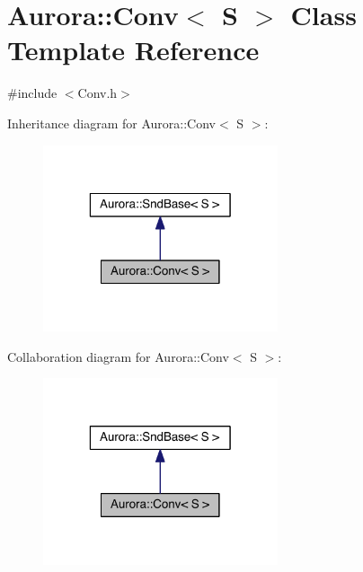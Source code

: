 \hypertarget{class_aurora_1_1_conv}{}\section{Aurora\+:\+:Conv$<$ S $>$ Class Template Reference}
\label{class_aurora_1_1_conv}


{\ttfamily \#include $<$Conv.\+h$>$}



Inheritance diagram for Aurora\+:\+:Conv$<$ S $>$\+:\nopagebreak
\begin{figure}[H]
\begin{center}
\leavevmode
\includegraphics[width=196pt]{class_aurora_1_1_conv__inherit__graph}
\end{center}
\end{figure}


Collaboration diagram for Aurora\+:\+:Conv$<$ S $>$\+:\nopagebreak
\begin{figure}[H]
\begin{center}
\leavevmode
\includegraphics[width=196pt]{class_aurora_1_1_conv__coll__graph}
\end{center}
\end{figure}

